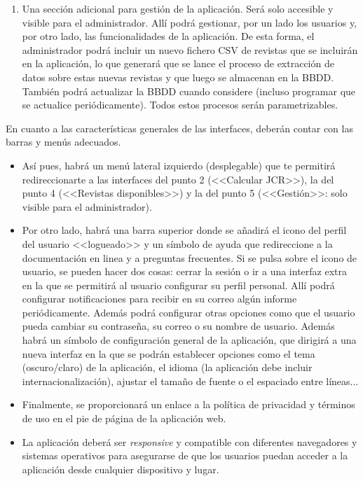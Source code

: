 \begin{enumerate}
	\item Una sección adicional para gestión de la aplicación. Será solo accesible y visible para el administrador. Allí podrá gestionar, por un lado los usuarios y, por otro lado, las funcionalidades de la aplicación. De esta forma, el administrador podrá incluir un nuevo fichero CSV de revistas que se incluirán en la aplicación, lo que generará que se lance el proceso de extracción de datos sobre estas nuevas revistas y que luego se almacenan en la BBDD. También podrá actualizar la BBDD cuando considere (incluso programar que se actualice periódicamente). Todos estos procesos serán parametrizables.
\end{enumerate}

En cuanto a las características generales de las interfaces, deberán contar con las barras y menús adecuados.

\begin{itemize}
	\item Así pues, habrá un menú lateral izquierdo (desplegable) que te permitirá redireccionarte a las interfaces del punto 2 (<<Calcular JCR>>), la del punto 4 (<<Revistas disponibles>>) y la del punto 5 (<<Gestión>>: solo visible para el administrador).

	\item Por otro lado, habrá una barra superior donde se añadirá el icono del perfil del usuario <<logueado>> y un símbolo de ayuda que redireccione a la documentación en linea y a preguntas frecuentes.	Si se pulsa sobre el icono de usuario, se pueden hacer dos cosas: cerrar la sesión o ir a una interfaz extra en la que se permitirá al usuario configurar su perfil personal. Allí podrá configurar notificaciones para recibir en su correo algún informe periódicamente. Además podrá configurar otras opciones como que el usuario pueda cambiar su contraseña, su correo o su nombre de usuario. Además habrá un símbolo de configuración general de la aplicación, que dirigirá a una nueva interfaz en la que se podrán establecer opciones como el tema (oscuro/claro) de la aplicación, el idioma (la aplicación debe incluir internacionalización), ajustar el tamaño de fuente o el espaciado entre líneas...

	\item Finalmente, se proporcionará un enlace a la política de privacidad y términos de uso en el pie de página de la aplicación web.

	\item La aplicación deberá ser \textit{responsive} y compatible con diferentes navegadores y sistemas operativos para asegurarse de que los usuarios puedan acceder a la aplicación desde cualquier dispositivo y lugar.
\end{itemize}








